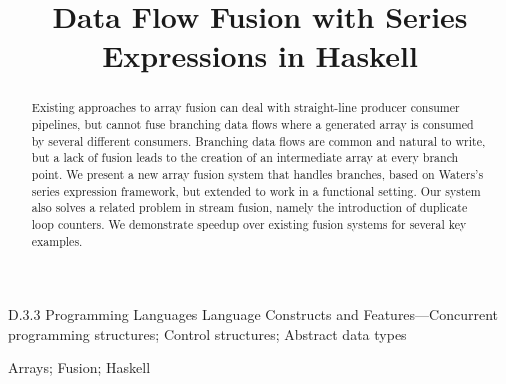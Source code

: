 \documentclass[preprint]{sigplanconf}
\begin{document}
\title	{Data Flow Fusion with Series Expressions in Haskell}


\exclusivelicense
{}
\maketitle
\makeatactive


\begin{abstract}
Existing approaches to array fusion can deal with straight-line producer consumer pipelines, but cannot fuse branching data flows where a generated array is consumed by several different consumers. Branching data flows are common and natural to write, but a lack of fusion leads to the creation of an intermediate array at every branch point. We present a new array fusion system that handles branches, based on Waters's series expression framework, but extended to work in a functional setting. Our system also solves a related problem in stream fusion, namely the introduction of duplicate loop counters. We demonstrate speedup over existing fusion systems for several key examples.
\end{abstract}

\category
	{D.3.3}
	{Programming Languages}
	{Language Constructs and Features---Concurrent programming structures; Control structures; Abstract data types}

\keywords
	Arrays; Fusion; Haskell












\vspace{-1ex}
\end{document}
